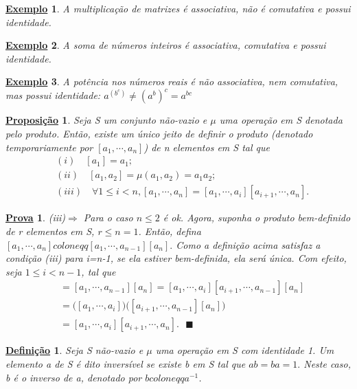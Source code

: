 \documentclass{article}
\newtheorem*{def*}{\underline{Defini\c c\~ao}}
\newtheorem*{prop*}{\underline{Proposi\c c\~ao}}
\newtheorem{example*}{\underline{Exemplo}}
\newtheorem*{proof*}{\underline{Prova}}
\renewcommand\qedsymbol{$\blacksquare$}
\begin{document}
 \begin{example*}
   A multiplica\c c\~ao de matrizes \'e associativa, n\~ao \'e comutativa e possui identidade.
 \end{example*}
\begin{example*}
  A soma de n\'umeros inteiros \'e associativa, comutativa e possui identidade.
\end{example*}
\begin{example*}
  A pot\^encia nos n\'umeros reais \'e n\~ao associativa, nem comutativa, mas possui identidade: $a^{(b^{c})} \neq (a^{b})^{c} = a^{bc}$
\end{example*}

\begin{prop*}
  Seja S um conjunto n\~ao-vazio e $\mu$ uma opera\c c\~ao em S denotada pelo produto. Ent\~ao, existe um \'unico jeito de definir o
produto (denotado temporariamente por $[a_{1}, \cdots, a_{n}]$) de n elementos em S tal que 
\begin{align*}
  &(i)\quad [a_{1}] = a_{1}; \\
  &(ii)\quad [a_{1}, a_{2}] = \mu(a_{1}, a_{2}) = a_{1}a_{2}; \\
  &(iii)\quad\forall 1\leq{i}<n, [a_{1}, \cdots, a_{n}] = [a_{1}, \cdots, a_{i}][a_{i+1}, \cdots, a_{n}].
\end{align*}
\end{prop*}
\begin{proof*}
  (iii)$\Rightarrow$ Para o caso $n\leq{2}$ \'e ok. Agora, suponha o produto bem-definido de r elementos em S, $r\leq{n=1}$. Ent\~ao,
defina $[a_{1}, \cdots, a_{n}]coloneqq [a_{1}, \cdots, a_{n-1}][a_{n}]. $ Como a defini\c c\~ao acima satisfaz a condi\c c\~ao (iii) para
i=n-1, se ela estiver bem-definida, ela ser\'a \'unica. Com efeito, seja $1\leq{i}<n-1$, tal que 
  \begin{align*}
    [a_{1}, \cdots, a_{n}] &= [a_{1}, \cdots, a_{n-1}][a_{n}] = [a_{1}, \cdots, a_{i}][a_{i+1}, \cdots, a_{n-1}][a_{n}]\\
                           &= \biggl([a_{1}, \cdots, a_{i}]\biggr)\biggl([a_{i+1}, \cdots, a_{n-1}][a_{n}]\biggr) \\
                           &= [a_{1}, \cdots, a_{i}][a_{i+1}, \cdots, a_{n}].\text{ \qedsymbol}
  \end{align*}
\end{proof*}
\begin{def*}
  Seja S n\~ao-vazio e $\mu$ uma opera\c c\~ao em S com identidade 1. Um elemento a de S \'e dito invers\'ivel se existe b em S tal que
 $ab = ba = 1.$ Neste caso, b \'e o inverso de a, denotado por $bcoloneqqa^{-1}$.
\end{def*}
\end{document}
